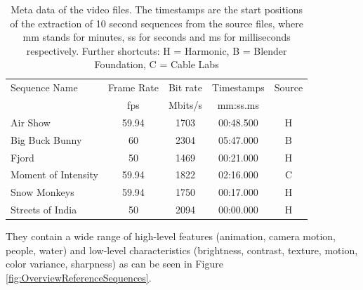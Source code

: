 \begin{table}[!t]
	\renewcommand{\arraystretch}{1.3}
	\centering
	\caption{Meta data of the video files. The timestamps are the start positions of the extraction of 10 second sequences from the source files, where mm stands for minutes, ss for seconds and ms for milliseconds respectively. Further shortcuts: H = Harmonic, B = Blender Foundation, C = Cable Labs}
	\label{tab:Specifications}
	\begin{tabular}{lcccc}
		\toprule
		Sequence Name       & Frame Rate & Bit rate & Timestamps & Source\\
							& fps  	   & Mbits/s    & mm:ss.ms   & \\
		\midrule
		Air Show            & 59.94    & 1703 & 00:48.500  &   H  \\
		Big Buck Bunny      & 60       & 2304 & 05:47.000  &   B  \\
		Fjord               & 50       & 1469 & 00:21.000  &   H  \\
		Moment of Intensity & 59.94    & 1822 & 02:16.000  &   C \\
		Snow Monkeys        & 59.94    & 1750 & 00:17.000  &   H  \\
		Streets of India    & 50       & 2094 & 00:00.000  &   H  \\
		\bottomrule
	\end{tabular}
\end{table}

They contain a wide range of high-level features (animation, camera motion, people, water) and low-level characteristics (brightness, contrast, texture, motion, color variance, sharpness) as can be seen in Figure \ref{fig:OverviewReferenceSequences}.

